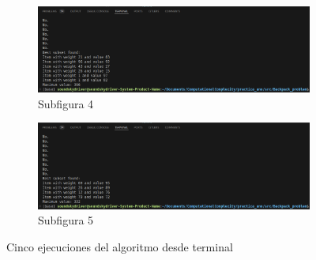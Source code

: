 \documentclass{article}
\begin{document}
\begin{figure}[H]
    \begin{subfigure}{0.7\textwidth}
        \centering
        \includegraphics[width=\textwidth]{../images/Screenshot from 2024-09-19 23-04-05.png}
        \caption{Subfigura 4}
        \label{fig:subfig4}
    \end{subfigure}
    \hfill
    \begin{subfigure}{0.7\textwidth}
        \centering
        \includegraphics[width=\textwidth]{../images/Screenshot from 2024-09-19 23-04-09.png}
        \caption{Subfigura 5}
        \label{fig:subfig5}
    \end{subfigure}

    \caption{Cinco ejecuciones del algoritmo desde terminal}
    \label{fig:all_subfigures}
\end{figure}
\end{document}
